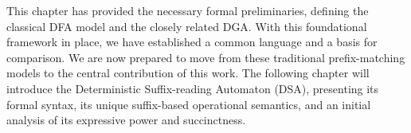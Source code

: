 This chapter has provided the necessary formal preliminaries, defining the classical DFA model and the closely related DGA. With this foundational framework in place, we have established a common language and a basis for comparison. We are now prepared to move from these traditional prefix-matching models to the central contribution of this work. The following chapter will introduce the Deterministic Suffix-reading Automaton (DSA), presenting its formal syntax, its unique suffix-based operational semantics, and an initial analysis of its expressive power and succinctness.






